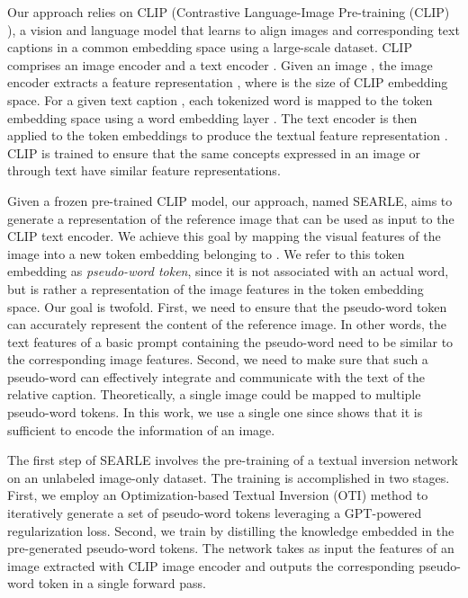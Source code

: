 \documentclass[10pt,twocolumn,letterpaper]{article}
\newcommand{\method}{SEARLE\xspace}
\begin{document}
Our approach relies on CLIP (Contrastive Language-Image Pre-training (CLIP) \cite{radford2021learning}), a vision and language model that learns to align images and corresponding text captions in a common embedding space using a large-scale dataset. CLIP comprises an image encoder  and a text encoder . Given an image , the image encoder extracts a feature representation , where  is the size of CLIP embedding space. For a given text caption , each tokenized word is mapped to the token embedding space  using a word embedding layer . The text encoder  is then applied to the token embeddings to produce the textual feature representation . CLIP is trained to ensure that the same concepts expressed in an image or through text have similar feature representations.
 
Given a frozen pre-trained CLIP model, our approach, named \method, aims to generate a representation of the reference image that can be used as input to the CLIP text encoder. We achieve this goal by mapping the visual features of the image into a new token embedding belonging to . We refer to this token embedding as \textit{pseudo-word token}, since it is not associated with an actual word, but is rather a representation of the image features in the token embedding space. Our goal is twofold. First, we need to ensure that the pseudo-word token can accurately represent the content of the reference image. In other words, the text features of a basic prompt containing the pseudo-word need to be similar to the corresponding image features. Second, we need to make sure that such a pseudo-word can effectively integrate and communicate with the text of the relative caption.
Theoretically, a single image could be mapped to multiple pseudo-word tokens. In this work, we use a single one since \cite{gal2022image} shows that it is sufficient to encode the information of an image.

The first step of \method involves the pre-training of a textual inversion network  on an unlabeled image-only dataset. The training is accomplished in two stages. First, we employ an Optimization-based Textual Inversion (OTI) method to iteratively generate a set of pseudo-word tokens leveraging a GPT-powered regularization loss. Second, we train  by distilling the knowledge embedded in the pre-generated pseudo-word tokens. The  network takes as input the features of an image extracted with CLIP image encoder and outputs the corresponding pseudo-word token in
a single forward pass. 
\end{document}
